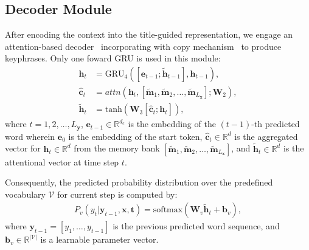 \documentclass[letterpaper]{article} %
\begin{document}
\subsection{Decoder Module}
After encoding the context into the title-guided representation, we engage an attention-based decoder~\cite{luong2015attention} incorporating with copy mechanism~\cite{see2017get_to_the_point} to produce keyphrases. Only one foward GRU is used in this module:
\begin{align}
\mathbf{h}_t &= \text{GRU}_4([\mathbf{e}_{t-1}; \tilde{\mathbf{h}}_{t-1}], \mathbf{h}_{t-1}), \\
\hat{\mathbf{c}}_t &= attn(\mathbf{h}_t, [\widetilde{\mathbf{m}}_1, \widetilde{\mathbf{m}}_2,\dots, \widetilde{\mathbf{m}}_{L_{\mathbf{x}}}]; \mathbf{W}_2), \\
\tilde{\mathbf{h}}_{t} &= \text{tanh}(\mathbf{W}_3[\hat{\mathbf{c}}_t; \mathbf{h}_t]),
\end{align}
where $t=1,2,\dots,L_{\mathbf{y}}$, $\mathbf{e}_{t-1} \in \mathbb{R}^{d_e}$ is the embedding of the $(t-1)$-th predicted word wherein $\mathbf{e}_0$ is the embedding of the start token, $\hat{\mathbf{c}}_t \in \mathbb{R}^d$ is the aggregated vector for $\mathbf{h}_t \in \mathbb{R}^d$ from the memory bank $[\widetilde{\mathbf{m}}_1, \widetilde{\mathbf{m}}_2,\dots, \widetilde{\mathbf{m}}_{L_{\mathbf{x}}}]$, and $\tilde{\mathbf{h}}_t \in \mathbb{R}^d$ is the attentional vector at time step $t$.

Consequently, the predicted probability distribution over the predefined vocabulary $\mathcal{V}$ for current step is computed by:
\begin{align}
P_{v}(y_{t}|\mathbf{y}_{t-1}, \mathbf{x}, \mathbf{t}) = \text{softmax}(\mathbf{W}_v\tilde{\mathbf{h}}_{t} + \mathbf{b}_v),
\end{align}
where $\mathbf{y}_{t-1} = [y_1,\dots, y_{t-1}]$ is the previous predicted word sequence, and $\mathbf{b}_v \in \mathbb{R}^{|\mathcal{V}|}$ is a learnable parameter vector.
\end{document}
